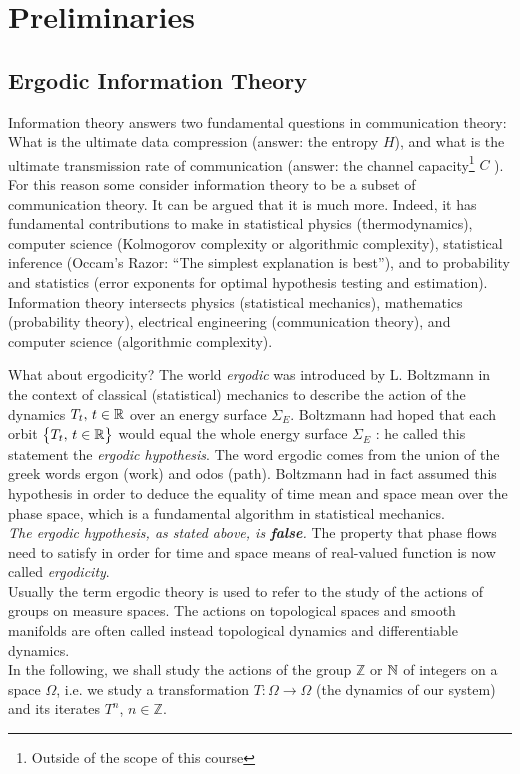 \chapter{Preliminaries}

\section{Ergodic Information Theory}
Information theory answers two fundamental questions in communication
theory: What is the ultimate data compression (answer: the entropy $H$),
and what is the ultimate transmission rate of communication (answer: the
channel capacity\footnote{Outside of the scope of this course} $C$ ). For this reason some consider information theory
to be a subset of communication theory. It can be argued that it is much more.
Indeed, it has fundamental contributions to make in statistical physics
(thermodynamics), computer science (Kolmogorov complexity or algorithmic complexity), statistical inference (Occam’s Razor: “The simplest
explanation is best”), and to probability and statistics (error exponents for
optimal hypothesis testing and estimation).
\\Information
theory intersects physics (statistical mechanics), mathematics (probability
theory), electrical engineering (communication theory), and computer science (algorithmic complexity). 

What about ergodicity? The world \textit{ergodic} was introduced by L. Boltzmann in the context of classical (statistical) mechanics to describe the action of the dynamics $T_t, \, t \in \mathbb{R}$ over an energy surface $\Sigma_E$. Boltzmann had hoped that each orbit $\big\{ T_t, \, t \in \mathbb{R} \big\}$ would equal the whole energy surface $\Sigma_E$ : he called this statement the \textit{ergodic hypothesis}. The word ergodic comes from the union of the greek words ergon (work) and odos (path). Boltzmann had in fact assumed this hypothesis in order to deduce the equality of time mean and space mean over the phase space, which is a fundamental algorithm in statistical mechanics. 
\\\textit{The ergodic hypothesis, as stated above, is \textbf{false}.} The property that phase flows need to satisfy in order for time and space means of real-valued function is now called \textit{ergodicity}.
\\Usually the term ergodic theory is used to refer to the study of the actions of groups on measure spaces. The actions on topological spaces and smooth manifolds are often called instead topological dynamics and differentiable dynamics. 
\\In the following, we shall study the actions of the group $\mathbb{Z}$ or $\mathbb{N}$ of integers on a space $\Omega$, i.e. we study a transformation $T: \Omega \longrightarrow \Omega$ (the dynamics of our system) and its iterates $T^n$, $n \in \mathbb{Z}$. 

